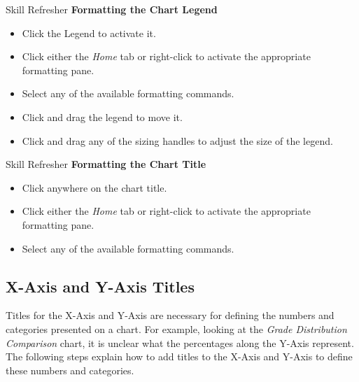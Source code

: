 \begin{center}
	\begin{sklbox}{Skill Refresher}
		\textbf{Formatting the Chart Legend}
		\\
		\begin{itemize}
			\setlength{\itemsep}{0pt}
			\setlength{\parskip}{0pt}
			\setlength{\parsep}{0pt}

			\item Click the Legend to activate it.
			\item Click either the \textit{Home} tab or right-click to activate the appropriate formatting pane.
			\item Select any of the available formatting commands.
			\item Click and drag the legend to move it.
			\item Click and drag any of the sizing handles to adjust the size of the legend.
			
		\end{itemize}
	\end{sklbox}
\end{center}

\begin{center}
	\begin{sklbox}{Skill Refresher}
		\textbf{Formatting the Chart Title}
		\\
		\begin{itemize}
			\setlength{\itemsep}{0pt}
			\setlength{\parskip}{0pt}
			\setlength{\parsep}{0pt}

			\item Click anywhere on the chart title.
			\item Click either the \textit{Home} tab or right-click to activate the appropriate formatting pane.
			\item Select any of the available formatting commands.
			
		\end{itemize}
	\end{sklbox}
\end{center}

\subsection{X-Axis and Y-Axis Titles}

Titles for the X-Axis and Y-Axis are necessary for defining the numbers and categories presented on a chart. For example, looking at the \textit{Grade Distribution Comparison} chart, it is unclear what the percentages along the Y-Axis represent. The following steps explain how to add titles to the X-Axis and Y-Axis to define these numbers and categories.

